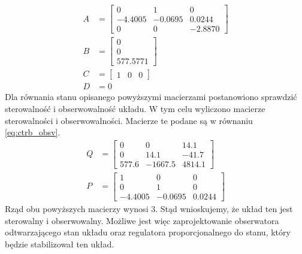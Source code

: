 \documentclass[11pt,a4paper]{article}
\begin{document}
\begin{equation}
\begin{aligned}
A &=
	\begin{bmatrix}
	0 & 1 & 0\\
	-4.4005 & -0.0695 & 0.0244\\
	0 & 0 & -2.8870
	\end{bmatrix}\\
B &=
	\begin{bmatrix}
	0\\
	0\\
	577.5771
	\end{bmatrix}\\
C &=
	\begin{bmatrix}
	1 & 0 & 0
	\end{bmatrix}\\
D &= 0
\end{aligned}
\label{eq:linear_ABCD_val}
\end{equation} 
Dla równania stanu opisanego powyższymi macierzami postanowiono sprawdzić sterowalność i obserwowalność układu. W tym celu wyliczono macierze sterowalności i obserwowalności. Macierze te podane są w równaniu \eqref{eq:ctrb_obsv}.
\begin{equation}
\begin{aligned}
Q &=
	\begin{bmatrix}
	0 & 0 & 14.1\\
	0 & 14.1 & -41.7\\
	577.6 & -1667.5 & 4814.1
	\end{bmatrix}\\
P &=
	\begin{bmatrix}
	1 & 0 & 0\\
	0 & 1 & 0\\
	-4.4005 & -0.0695 & 0.0244
	\end{bmatrix}
\end{aligned}
\label{eq:ctrb_obsv}
\end{equation}
Rząd obu powyższych macierzy wynosi 3. Stąd wnioskujemy, że układ ten jest sterowalny i obserwowalny. Możliwe jest więc zaprojektowanie obserwatora odtwarzającego stan układu oraz regulatora proporcjonalnego do stanu, który będzie stabilizował ten układ.
\end{document}
